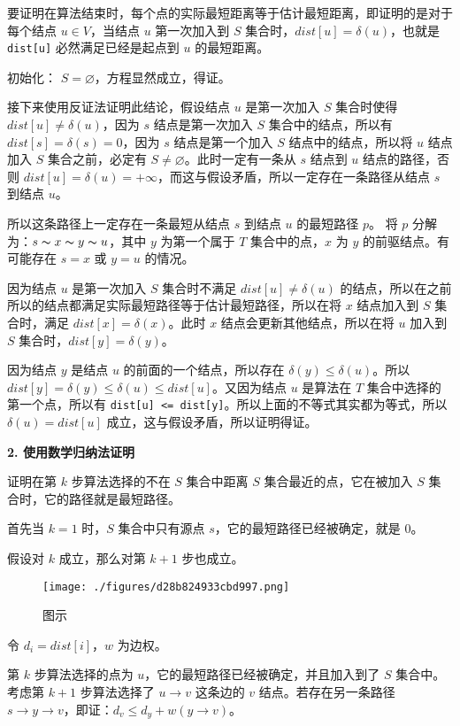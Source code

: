 要证明在算法结束时，每个点的实际最短距离等于估计最短距离，即证明的是对于每个结点 $u \in V$，当结点 $u$ 第一次加入到 $S$ 集合时，$dist[u] =\delta(u)$，也就是 \verb|dist[u]| 必然满足已经是起点到 $u$ 的最短距离。

初始化： $S = \varnothing$，方程显然成立，得证。

接下来使用反证法证明此结论，假设结点 $u$ 是第一次加入 $S$ 集合时使得 $dist[u] \neq \delta(u)$，因为 $s$ 结点是第一次加入 $S$ 集合中的结点，所以有 $dist[s] = \delta(s) = 0$，因为 $s$ 结点是第一个加入 $S$ 结点中的结点，所以将 $u$ 结点加入 $S$ 集合之前，必定有 $S \neq \varnothing$。此时一定有一条从 $s$ 结点到 $u$ 结点的路径，否则 $dist[u] = \delta(u) = +\infty$，而这与假设矛盾，所以一定存在一条路径从结点 $s$ 到结点 $u$。

所以这条路径上一定存在一条最短从结点 $s$ 到结点 $u$ 的最短路径 $p$。
将 $p$ 分解为：$s \thicksim x \thicksim y \thicksim u$，其中 $y$ 为第一个属于 $T$ 集合中的点，$x$ 为 $y$ 的前驱结点。有可能存在 $s = x$ 或 $y = u$ 的情况。

因为结点 $u$ 是第一次加入 $S$ 集合时不满足 $dist[u] \neq \delta(u)$ 的结点，所以在之前所以的结点都满足实际最短路径等于估计最短路径，所以在将 $x$ 结点加入到 $S$ 集合时，满足 $dist[x] = \delta(x)$。此时 $x$ 结点会更新其他结点，所以在将 $u$ 加入到 $S$ 集合时，$dist[y] = \delta(y)$。

因为结点 $y$ 是结点 $u$ 的前面的一个结点，所以存在 $\delta(y) \leq \delta(u)$。所以 $dist[y] = \delta(y) \leq \delta(u) \leq dist[u]$。又因为结点 $u$ 是算法在 $T$ 集合中选择的第一个点，所以有 \verb|dist[u] <= dist[y]|。所以上面的不等式其实都为等式，所以 $\delta(u) = dist[u]$ 成立，这与假设矛盾，所以证明得证。

\textbf{2. 使用数学归纳法证明}

证明在第 $k$ 步算法选择的不在 $S$ 集合中距离 $S$ 集合最近的点，它在被加入 $S$ 集合时，它的路径就是最短路径。

首先当 $k = 1$ 时，$S$ 集合中只有源点 $s$，它的最短路径已经被确定，就是 $0$。

假设对 $k$ 成立，那么对第 $k + 1$ 步也成立。

\begin{figure}[ht]
\centering
\texttt{[image: ./figures/d28b824933cbd997.png]}
\caption{图示} \label{fig_SSSP_1}
\end{figure}

令 $d_i = dist[i]$，$w$ 为边权。

第 $k$ 步算法选择的点为 $u$，它的最短路径已经被确定，并且加入到了 $S$ 集合中。考虑第 $k + 1$ 步算法选择了 $u \to v$ 这条边的 $v$ 结点。若存在另一条路径 $s \to y \to v$，即证：$d_v \leq d_y + w(y \to v)$。

